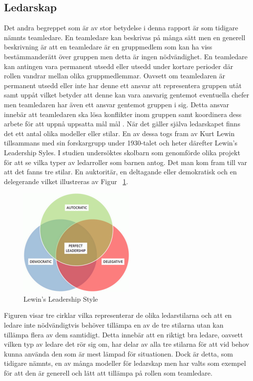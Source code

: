 \subsection{Ledarskap}
Det andra begreppet som är av stor betydelse i denna rapport är som tidigare nämnts teamledare. En teamledare kan beskrivas på många sätt men en generell beskrivning är att en teamledare är en gruppmedlem som kan ha viss bestämmanderätt över gruppen men detta är ingen nödvändighet. En teamledare kan antingen vara permanent utsedd eller utsedd under kortare perioder där rollen vandrar mellan olika gruppmedlemmar. Oavsett om teamledaren är permanent utsedd eller inte har denne ett ansvar att representera gruppen utåt samt uppåt vilket betyder att denne kan vara ansvarig gentemot eventuella chefer men teamledaren har även ett ansvar gentemot gruppen i sig. Detta ansvar innebär att teamledaren ska lösa konflikter inom gruppen samt koordinera dess arbete för att uppnå uppsatta mål mål \citep{BD}. 
\newline \newline
När det gäller själva ledarskapet finns det ett antal olika modeller eller stilar. En av dessa togs fram av Kurt Lewin tillsammans med sin forskargrupp under 1930-talet och heter därefter Lewin's Leadership Syles. I studien undersöktes skolbarn som genomförde olika projekt för att se vilka typer av ledarroller som barnen antog. Det man kom fram till var att det fanns tre stilar. En auktoritär, en deltagande eller demokratisk och en delegerande \citep{KAC} vilket illustreras av Figur ~\ref{fig:Lewin}. 
\begin{figure}[H]
\centerline{\includegraphics{adam-tex/graphic/leadership}}
\caption{Lewin's Leadership Style}
\label{fig:Lewin}
\end{figure}
\noindent Figuren visar tre cirklar vilka representerar de olika ledarstilarna och att en ledare inte nödvändigtvis behöver tillämpa en av de tre stilarna utan kan tillämpa flera av dem samtidigt. Detta innebär att en riktigt bra ledare, oavsett vilken typ av ledare det rör sig om, har delar av alla tre stilarna för att vid behov kunna använda den som är mest lämpad för situationen. Dock är detta, som tidigare nämnts, en av många modeller för ledarskap men har valts som exempel för att den är generell och lätt att tillämpa på rollen som teamledare.